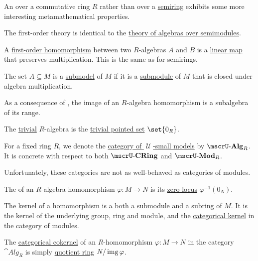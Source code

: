 \begin{definition}\label{def:algebra_over_ring}
  An  over a commutative ring \( R \) rather than over a \hyperref[def:algebra_over_semiring]{semiring} exhibits some more interesting metamathematical properties.

  \begin{thmenum}
     The first-order theory is identical to the \hyperref[def:agebra_over_semiring/theory]{theory of algebras over semimodules}.

     A \hyperref[def:first_order_homomorphism]{first-order homomorphism} between two \( R \)-algebras \( A \) and \( B \) is a \hyperref[def:semimodule/homomorphism]{linear map} that preserves multiplication. This is the same as for semirings.

     The set \( A \subseteq M \) is a \hyperref[thm:substructure_is_model]{submodel} of \( M \) if it is a \hyperref[def:monoid/submodel]{submodule} of \( M \) that is closed under algebra multiplication.

    As a consequence of , the image of an \( R \)-algebra homomorphism is a subalgebra of its range.

     The \hyperref[thm:substructures_form_complete_lattice/bottom]{trivial} \( R \)-algebra is the \hyperref[def:pointed_set/trivial]{trivial pointed set} \( \set{ 0_R } \).

     For a fixed ring \( R \), we denote the \hyperref[def:category_of_small_first_order_models]{category of \( \mscrU \)-small models} by \( \ucat{Alg}_R \). It is concrete with respect to both \( \ucat{CRing} \) and \( \ucat{Mod}_R \).

    Unfortunately, these categories are not as well-behaved as categories of modules.

     The  of an \( R \)-algebra homomorphism \( \varphi: M \to N \) is its \hyperref[def:zero_locus]{zero locus} \( \varphi^{-1}(0_N) \).

    The kernel of a homomorphism is a both a submodule and a subring of \( M \). It is the kernel of the underlying group, ring and module, and the \hyperref[def:zero_morphisms/cokernel]{categorical kernel} in the category of modules.

     The \hyperref[def:zero_morphisms/cokernel]{categorical cokernel} of an \( R \)-homomorphism \( \varphi: M \to N \) in the category \( \cat{Alg}_R \) is simply \hyperref[def:ring/quotient]{quotient ring} \( N / \operatorname{img} \varphi \).


\end{thmenum}
\end{definition}
